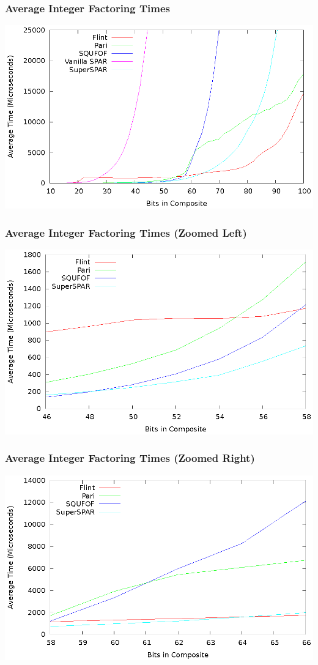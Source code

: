 \documentclass{beamer}
\begin{document}
\begin{frame}
\frametitle{Average Integer Factoring Times}
\includegraphics[scale=0.86]{factor-average}
\end{frame}
\begin{frame}
\frametitle{Average Integer Factoring Times (Zoomed Left)}
\includegraphics[scale=0.86]{factor-average-zoom-left}
\end{frame}
\begin{frame}
\frametitle{Average Integer Factoring Times (Zoomed Right)}
\includegraphics[scale=0.86]{factor-average-zoom-right}
\end{frame}
\end{document}
